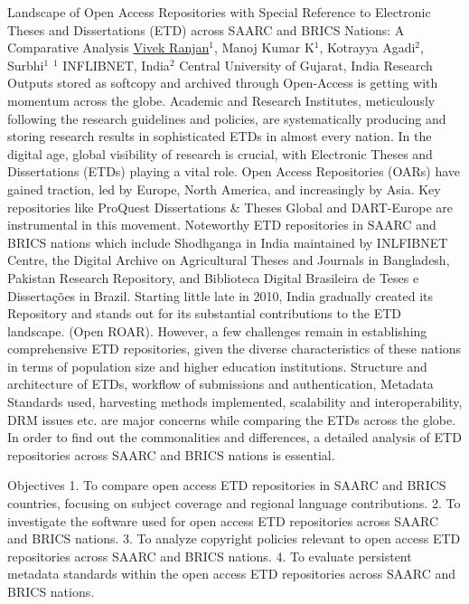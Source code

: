 

    \begin{abstract_online}{Landscape of Open Access Repositories with Special Reference to Electronic Theses and Dissertations (ETD) across SAARC and BRICS Nations: A Comparative Analysis}{%
        \underline{Vivek Ranjan}$^{1}$, Manoj Kumar K$^{1}$, Kotrayya  Agadi$^{2}$, Surbhi$^{1}$}{%
        }{%
        $^1$ INFLIBNET, India\newline{}$^2$ Central University of Gujarat, India}
        Research Outputs stored as softcopy and archived through Open-Access is getting with momentum across the globe. Academic and Research Institutes, meticulously following the research guidelines and policies, are systematically producing and storing research results in sophisticated ETDs in almost every nation. In the digital age, global visibility of research is crucial, with Electronic Theses and Dissertations (ETDs) playing a vital role. Open Access Repositories (OARs) have gained traction, led by Europe, North America, and increasingly by Asia. Key repositories like ProQuest Dissertations \& Theses Global and DART-Europe are instrumental in this movement. Noteworthy ETD repositories in SAARC and BRICS nations which include Shodhganga in India maintained by INLFIBNET Centre, the Digital Archive on Agricultural Theses and Journals in Bangladesh, Pakistan Research Repository, and Biblioteca Digital Brasileira de Teses e Dissertações in Brazil. Starting little late in 2010, India gradually created its Repository and stands out for its substantial contributions to the ETD landscape. (Open ROAR). However, a few challenges remain in establishing comprehensive ETD repositories, given the diverse characteristics of these nations in terms of population size and higher education institutions. Structure and architecture of ETDs, workflow of submissions and authentication, Metadata Standards used, harvesting methods implemented, scalability and interoperability, DRM issues etc. are major concerns while comparing the ETDs across the globe. In order to find out the commonalities and differences, a detailed analysis of ETD repositories across SAARC and BRICS nations is essential.

        Objectives
        1. To compare open access ETD repositories in SAARC and BRICS countries, focusing on subject coverage and regional language contributions.
        2. To investigate the software used for open access ETD repositories across SAARC and BRICS nations.
        3. To analyze copyright policies relevant to open access ETD repositories across SAARC and BRICS nations.
        4. To evaluate persistent metadata standards within the open access ETD repositories across SAARC and BRICS nations.


\end{abstract_online}
